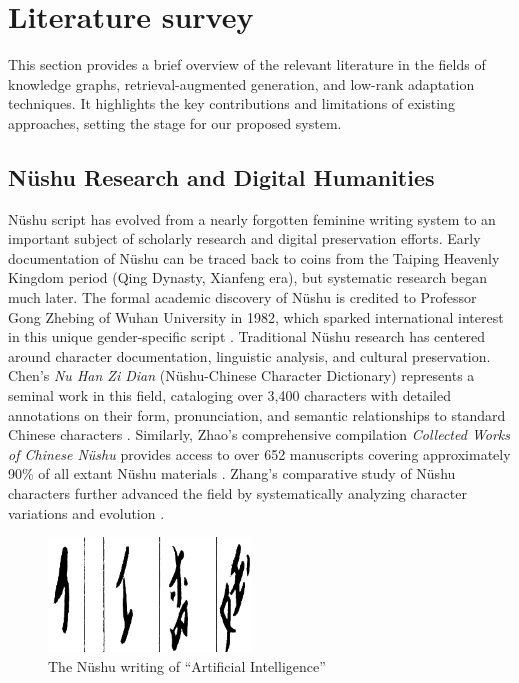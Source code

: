 \documentclass{article}
\begin{document}
\section{Literature survey}
\label{sec:lite}
    This section provides a brief overview of the relevant literature in the fields of knowledge graphs, retrieval-augmented generation, and low-rank adaptation techniques. It highlights the key contributions and limitations of existing approaches, setting the stage for our proposed system.

\subsection{N\"{u}shu Research and Digital Humanities}
\label{ssec:nushu_dh}
    N\"{u}shu script has evolved from a nearly forgotten feminine writing system to an important subject of scholarly research and digital preservation efforts. Early documentation of N\"{u}shu can be traced back to coins from the Taiping Heavenly Kingdom period (Qing Dynasty, Xianfeng era), but systematic research began much later. The formal academic discovery of N\"{u}shu is credited to Professor Gong Zhebing of Wuhan University in 1982, which sparked international interest in this unique gender-specific script \cite{zhao2005nushu}.
    Traditional N\"{u}shu research has centered around character documentation, linguistic analysis, and cultural preservation. Chen's \textit{Nu Han Zi Dian} (N\"{u}shu-Chinese Character Dictionary) represents a seminal work in this field, cataloging over 3,400 characters with detailed annotations on their form, pronunciation, and semantic relationships to standard Chinese characters \cite{chen2006nuhanzi}. Similarly, Zhao's comprehensive compilation \textit{Collected Works of Chinese N\"{u}shu} provides access to over 652 manuscripts covering approximately 90\% of all extant N\"{u}shu materials \cite{zhao2005nushu}. Zhang's comparative study of N\"{u}shu characters further advanced the field by systematically analyzing character variations and evolution \cite{zhang2006nushu}.
    \begin{figure}[htb]
    \centering
    \includegraphics[width=0.48\textwidth]{images/AI_in_nvshu.png}
    \caption{The Nüshu writing of “Artificial Intelligence”}
    \label{fig:ai_in_nvshu}
    \end{figure}
\end{document}
